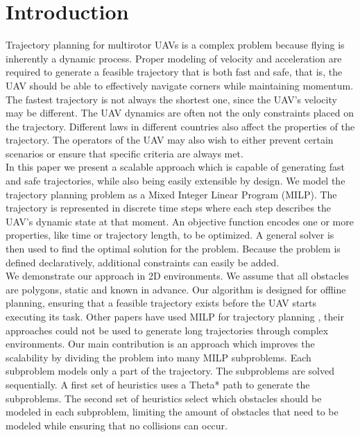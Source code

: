 \section{Introduction}
Trajectory planning for multirotor UAVs is a complex problem because flying is inherently a dynamic process. Proper modeling of velocity and acceleration are required to generate a feasible trajectory that is both fast and safe, that is, the UAV should be able to effectively navigate corners while maintaining momentum. The fastest trajectory is not always the shortest one, since the UAV's velocity may be different. The UAV dynamics are often not the only constraints placed on the trajectory. Different laws in different countries also affect the properties of the trajectory. The operators of the UAV may also wish to either prevent certain scenarios or ensure that specific criteria are always met. \\
In this paper we present a scalable approach which is capable of generating fast and safe trajectories, while also being easily extensible by design. We model the trajectory planning problem as a Mixed Integer Linear Program (MILP). The trajectory is represented in discrete time steps where each step describes the UAV's dynamic state at that moment. 
An objective function encodes one or more properties, like time or trajectory length, to be optimized. A general solver is then used to find the optimal solution for the problem. Because the problem is defined declaratively, additional constraints can easily be added.\\
We demonstrate our approach in 2D environments. We assume that all obstacles are polygons, static and known in advance. Our algorithm is designed for offline planning, ensuring that a feasible trajectory exists before the UAV starts executing its task. 
Other papers have used MILP for trajectory planning \cite{Schouwenaars2001}, their approaches could not be used to generate long trajectories through complex environments. Our main contribution is an approach which improves the scalability by dividing the problem into many MILP subproblems. Each subproblem models only a part of the trajectory. The subproblems are solved sequentially. A first set of heuristics uses a Theta* path to generate the subproblems. The second set of heuristics select which obstacles should be modeled in each subproblem, limiting the amount of obstacles that need to be modeled while ensuring that no collisions can occur.

